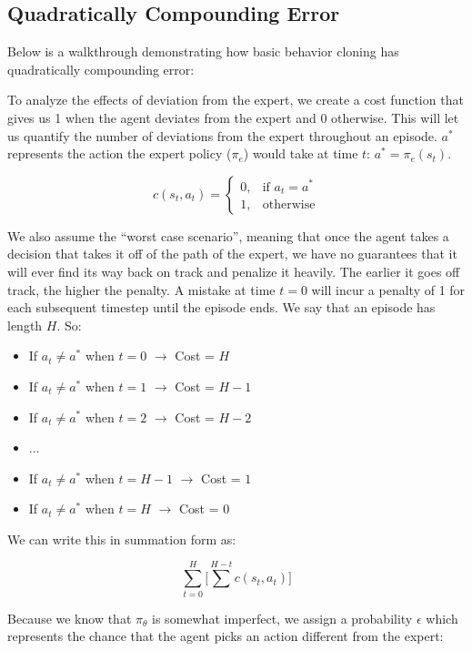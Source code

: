 \subsection{Quadratically Compounding Error}
\begin{flushleft}
    \large Below is a walkthrough demonstrating how basic behavior cloning has quadratically compounding error: \break

    To analyze the effects of deviation from the expert, we create a cost function that gives us 1 when the agent deviates from the expert and 0 otherwise. This will let us quantify the number of deviations from the expert throughout an episode. $a^*$ represents the action the expert policy ($\pi_e$) would take at time $t$: $a^* = \pi_e(s_t)$.

    $$c(s_t, a_t) = \begin{cases} 
          0, & \textrm{if } a_t = a^* \\
          1, & \textrm{otherwise} 
       \end{cases}
    $$

    We also assume the ``worst case scenario'', meaning that once the agent takes a decision that takes it off of the path of the expert, we have no guarantees that it will ever find its way back on track and penalize it heavily. The earlier it goes off track, the higher the penalty. A mistake at time $t = 0$ will incur a penalty of 1 for each subsequent timestep until the episode ends. We say that an episode has length $H$. So:

    \begin{itemize}
        \item If $a_t \neq a^*$  when $t=0$ $\rightarrow$ Cost = $H$
        \item If $a_t \neq a^*$  when $t=1$ $\rightarrow$ Cost = $H-1$
        \item If $a_t \neq a^*$  when $t=2$ $\rightarrow$ Cost = $H-2$
        \item ...
        \item If $a_t \neq a^*$  when $t=H-1$ $\rightarrow$ Cost = $1$
        \item If $a_t \neq a^*$  when $t=H$ $\rightarrow$ Cost = $0$
    \end{itemize}

    We can write this in summation form as:

    $$\sum_{t=0}^H \biggl[ \sum^{H-t} c(s_t, a_t)\biggr]$$

    Because we know that $\pi_\theta$ is somewhat imperfect, we assign a probability $\epsilon$ which represents the chance that the agent picks an action different from the expert:


\end{flushleft}
